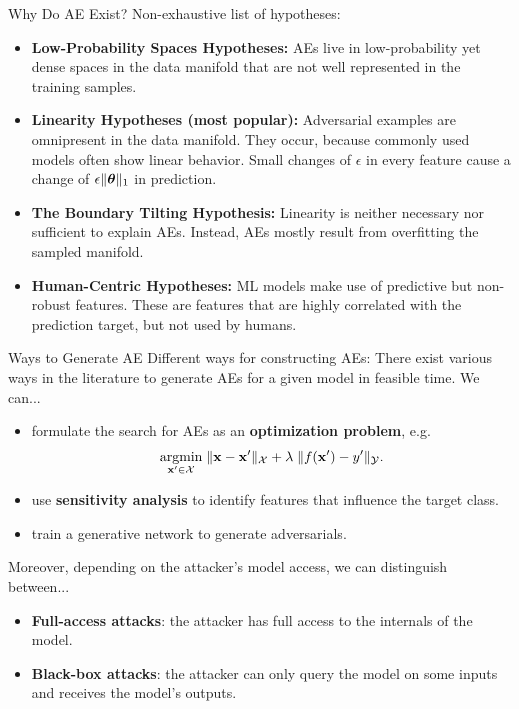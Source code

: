 \documentclass[11pt,compress,t,notes=noshow, aspectratio=169, xcolor=table]{beamer}
\begin{document}
\begin{vbframe}[c]{Why Do AE Exist?}
    Non-exhaustive list of hypotheses:
    \begin{itemize}
        \item \textbf{Low-Probability Spaces Hypotheses:} AEs live in low-probability yet dense spaces in the data manifold that are not well represented in the training samples. 
        \smallskip
        \item \textbf{Linearity Hypotheses (most popular):} Adversarial examples are omnipresent in the data manifold. They occur, because commonly used models often show linear behavior. Small changes of $\epsilon$ in every feature cause a change of $\epsilon\|\thetab\|_1$ in prediction. 
        \smallskip
        \item \textbf{The Boundary Tilting Hypothesis:} Linearity is neither necessary nor sufficient to explain AEs. Instead, AEs mostly result from overfitting the sampled manifold. 
        \smallskip
        \item \textbf{Human-Centric Hypotheses:} ML models make use of predictive but non-robust features. These are features that are highly correlated with the prediction target, but not used by humans. 
    \end{itemize}

\end{vbframe}

\begin{vbframe}[c]{Ways to Generate AE}
Different ways for constructing AEs:
There exist various ways in the literature to generate AEs for a given model in feasible time. We can...
\begin{itemize}
    \item formulate the search for AEs as an \textbf{optimization problem}, e.g. 
    \begin{equation*}
        \label{eq:optimization}
        \underset{\xv'\in \Xspace}{\text{argmin}}\; \| \xv-\xv' \|_{\Xspace} + \lambda\;    \|f(\xv')-y'\|_{\Yspace}.
    \end{equation*}
    \item use \textbf{sensitivity analysis} to identify features that influence the target class.
    \item train a generative network to generate adversarials.
\end{itemize}
Moreover, depending on the attacker's model access, we can distinguish between...
\begin{itemize}
    \item \textbf{Full-access attacks}: the attacker has full access to the internals of the model.
    \item \textbf{Black-box attacks}: the attacker can only query the model on some inputs and receives the model's outputs.
\end{itemize}
\end{vbframe}
\end{document}
